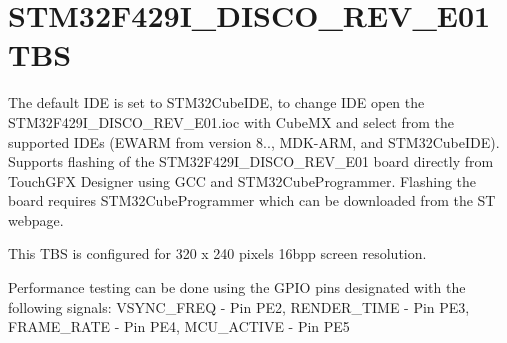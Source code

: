 \chapter{STM32\+F429\+I\+\_\+\+DISCO\+\_\+\+REV\+\_\+\+E01 TBS}
\hypertarget{md_readme}{}\label{md_readme}
\label{md_readme_autotoc_md23}%
%
 The default IDE is set to STM32\+Cube\+IDE, to change IDE open the STM32\+F429\+I\+\_\+\+DISCO\+\_\+\+REV\+\_\+\+E01.\+ioc with Cube\+MX and select from the supported IDEs (EWARM from version 8.., MDK-\/\+ARM, and STM32\+Cube\+IDE). Supports flashing of the STM32\+F429\+I\+\_\+\+DISCO\+\_\+\+REV\+\_\+\+E01 board directly from Touch\+GFX Designer using GCC and STM32\+Cube\+Programmer. Flashing the board requires STM32\+Cube\+Programmer which can be downloaded from the ST webpage.

This TBS is configured for 320 x 240 pixels 16bpp screen resolution. ~\newline


Performance testing can be done using the GPIO pins designated with the following signals\+: VSYNC\+\_\+\+FREQ -\/ Pin PE2, RENDER\+\_\+\+TIME -\/ Pin PE3, FRAME\+\_\+\+RATE -\/ Pin PE4, MCU\+\_\+\+ACTIVE -\/ Pin PE5 